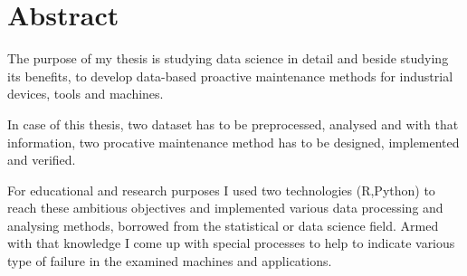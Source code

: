 \chapter*{Abstract}

The purpose of my thesis is studying data science in detail and beside studying its benefits, to develop data-based proactive maintenance methods for industrial devices, tools and machines.

In case of this thesis, two dataset has to be preprocessed, analysed and with that information, two procative maintenance method has to be designed, implemented and verified.

For educational and research purposes I used two technologies (R,Python) to reach these ambitious objectives and implemented various data processing and analysing methods, borrowed from the statistical or data science field. Armed with that knowledge I come up with special processes to help to indicate various type of failure in the examined machines and applications.
